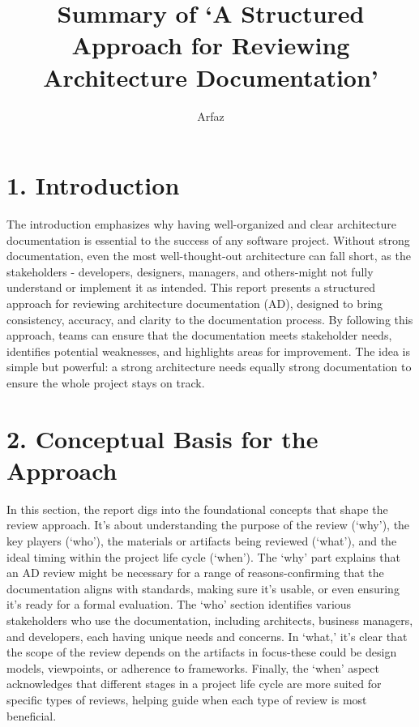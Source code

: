 \documentclass{article}
\title{Summary of `A Structured Approach for Reviewing Architecture Documentation'}
\author{Arfaz}
\date{}
\begin{document}
\maketitle

\section*{1. Introduction}
The introduction emphasizes why having well-organized and clear architecture documentation is essential to the success of any software project. Without strong documentation, even the most well-thought-out architecture can fall short, as the stakeholders - developers, designers, managers, and others-might not fully understand or implement it as intended. This report presents a structured approach for reviewing architecture documentation (AD), designed to bring consistency, accuracy, and clarity to the documentation process. By following this approach, teams can ensure that the documentation meets stakeholder needs, identifies potential weaknesses, and highlights areas for improvement. The idea is simple but powerful: a strong architecture needs equally strong documentation to ensure the whole project stays on track.

\section*{2. Conceptual Basis for the Approach}
In this section, the report digs into the foundational concepts that shape the review approach. It’s about understanding the purpose of the review (`why'), the key players (`who'), the materials or artifacts being reviewed (`what'), and the ideal timing within the project life cycle (`when'). The `why' part explains that an AD review might be necessary for a range of reasons-confirming that the documentation aligns with standards, making sure it’s usable, or even ensuring it’s ready for a formal evaluation. The `who' section identifies various stakeholders who use the documentation, including architects, business managers, and developers, each having unique needs and concerns. In `what,' it’s clear that the scope of the review depends on the artifacts in focus-these could be design models, viewpoints, or adherence to frameworks. Finally, the `when' aspect acknowledges that different stages in a project life cycle are more suited for specific types of reviews, helping guide when each type of review is most beneficial.
\end{document}
